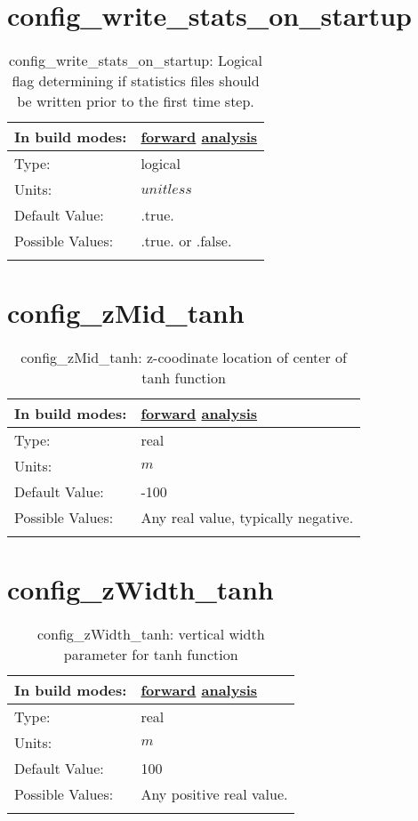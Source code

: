 \section[config\_write\_stats\_on\_startup]{config\_write\_stats\_on\_startup}
\label{sec:nm_sec_config_write_stats_on_startup}
\begin{center}
\begin{longtable}{| p{2.0in} || p{4.0in} |}
    \hline
    In build modes: & \hyperref[subsec:forward_nm_tab_io]{forward} \hyperref[subsec:analysis_nm_tab_io]{analysis} \\
    \hline
    Type: & logical \\
    \hline
    Units: & $unitless$ \\
    \hline
    Default Value: & .true. \\
    \hline
    Possible Values: & .true. or .false. \\
    \hline
    \caption{config\_write\_stats\_on\_startup: Logical flag determining if statistics files should be written prior to the first time step.}
\end{longtable}
\end{center}
\section[config\_zMid\_tanh]{config\_zMid\_tanh}
\label{sec:nm_sec_config_zMid_tanh}
\begin{center}
\begin{longtable}{| p{2.0in} || p{4.0in} |}
    \hline
    In build modes: & \hyperref[subsec:forward_nm_tab_vmix_tanh]{forward} \hyperref[subsec:analysis_nm_tab_vmix_tanh]{analysis} \\
    \hline
    Type: & real \\
    \hline
    Units: & $m$ \\
    \hline
    Default Value: & -100 \\
    \hline
    Possible Values: & Any real value, typically negative. \\
    \hline
    \caption{config\_zMid\_tanh: z-coodinate location of center of tanh function}
\end{longtable}
\end{center}
\section[config\_zWidth\_tanh]{config\_zWidth\_tanh}
\label{sec:nm_sec_config_zWidth_tanh}
\begin{center}
\begin{longtable}{| p{2.0in} || p{4.0in} |}
    \hline
    In build modes: & \hyperref[subsec:forward_nm_tab_vmix_tanh]{forward} \hyperref[subsec:analysis_nm_tab_vmix_tanh]{analysis} \\
    \hline
    Type: & real \\
    \hline
    Units: & $m$ \\
    \hline
    Default Value: & 100 \\
    \hline
    Possible Values: & Any positive real value. \\
    \hline
    \caption{config\_zWidth\_tanh: vertical width parameter for tanh function}
\end{longtable}
\end{center}
